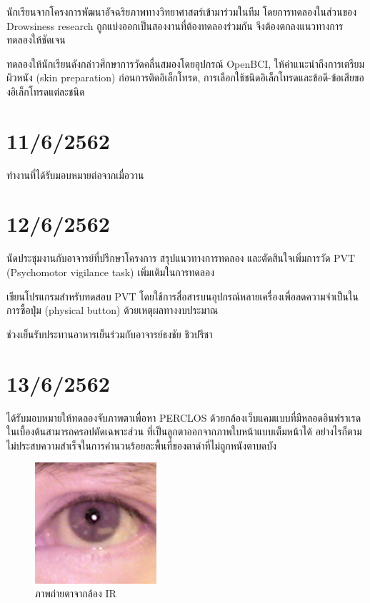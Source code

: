 นักเรียนจากโครงการพัฒนาอัจฉริยภาพทางวิทยาศาสตร์เข้ามาร่วมในทีม โดยการทดลองในส่วนของ Drowsiness research
ถูกแบ่งออกเป็นสองงานที่ต้องทดลองร่วมกัน จึงต้องตกลงแนวทางการทดลองให้ชัดเจน

ทดลองให้นักเรียนดังกล่าวศึกษาการวัดคลื่นสมองโดยอุปกรณ์ OpenBCI, ให้คำแนะนำถึงการเตรียมผิวหนัง (skin preparation)
ก่อนการติดอิเล็กโทรด, การเลือกใช้ชนิดอิเล็กโทรดและข้อดี-ข้อเสียของอิเล็กโทรดแต่ละชนิด

\section*{11/6/2562}

ทำงานที่ได้รับมอบหมายต่อจากเมื่อวาน

\section*{12/6/2562}

นัดประชุมงานกับอาจารย์ที่ปรึกษาโครงการ สรุปแนวทางการทดลอง และตัดสินใจเพิ่มการวัด PVT (Psychomotor vigilance task)
เพิ่มเติมในการทดลอง

เขียนโปรแกรมสำหรับทดสอบ PVT โดยใช้การสื่อสารบนอุปกรณ์หลายเครื่องเพื่อลดความจำเป็นในการซื้อปุ่ม (physical button)
ด้วยเหตุผลทางงบประมาณ

ช่วงเย็นรับประทานอาหารเย็นร่วมกับอาจารย์ธงชัย ชิวปรีชา

\section*{13/6/2562}

ได้รับมอบหมายให้ทดลองจับภาพตาเพื่อหา PERCLOS ด้วยกล้องเว็บแคมแบบที่มีหลอดอินฟราเรด ในเบื้องต้นสามารถครอปตัดเฉพาะส่วน
ที่เป็นลูกตาออกจากภาพใบหน้าแบบเต็มหน้าได้ อย่างไรก็ตาม ไม่ประสบความสำเร็จในการคำนวนร้อยละพื้นที่ของตาดำที่ไม่ถูกหนังตาบดบัง

\begin{figure}[H]
    \centering
    \includegraphics[width=0.4\textwidth]{images/268.png}
    \caption{ภาพถ่ายตาจากล้อง IR}
\end{figure}